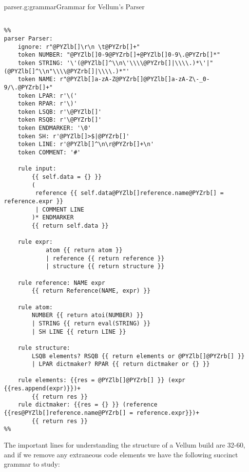 \begin{code}{parser.g:grammar}{Grammar for Vellum's Parser}
\begin{Verbatim}[commandchars=@\[\]]
        
%%
parser Parser:
    ignore: r"@PYZlb[]\r\n \t@PYZrb[]+"
    token NUMBER: "@PYZlb[]0-9@PYZrb[]+@PYZlb[]0-9\.@PYZrb[]*"
    token STRING: '\'(@PYZlb[]^\\n\'\\\\@PYZrb[]|\\\\.)*\'|"(@PYZlb[]^\\n"\\\\@PYZrb[]|\\\\.)*"'
    token NAME: r"@PYZlb[]a-zA-Z@PYZrb[]@PYZlb[]a-zA-Z\-_0-9/\.@PYZrb[]+"
    token LPAR: r'\('
    token RPAR: r'\)'
    token LSQB: r'\@PYZlb[]'
    token RSQB: r'\@PYZrb[]'
    token ENDMARKER: '\0'
    token SH: r'@PYZlb[]>$|@PYZrb[]'
    token LINE: r'@PYZlb[]^\n\r@PYZrb[]+\n'
    token COMMENT: '#'

    rule input: 
        {{ self.data = {} }} 
        ( 
         reference {{ self.data@PYZlb[]reference.name@PYZrb[] = reference.expr }}
         | COMMENT LINE
        )* ENDMARKER 
        {{ return self.data }}

    rule expr: 
            atom {{ return atom }}
            | reference {{ return reference }}
            | structure {{ return structure }}

    rule reference: NAME expr 
        {{ return Reference(NAME, expr) }}

    rule atom: 
        NUMBER {{ return atoi(NUMBER) }} 
        | STRING {{ return eval(STRING) }}
        | SH LINE {{ return LINE }}

    rule structure: 
        LSQB elements? RSQB {{ return elements or @PYZlb[]@PYZrb[] }} 
        | LPAR dictmaker? RPAR {{ return dictmaker or {} }}

    rule elements: {{res = @PYZlb[]@PYZrb[] }} (expr {{res.append(expr)}})+ 
        {{ return res }}
    rule dictmaker: {{res = {} }} (reference {{res@PYZlb[]reference.name@PYZrb[] = reference.expr}})+ 
        {{ return res }}
%%
\end{Verbatim}

\end{code}

The important lines for understanding the structure of a Vellum build are 32-60,
and if we remove any extraneous code elements we have the following succinct
grammar to study:

